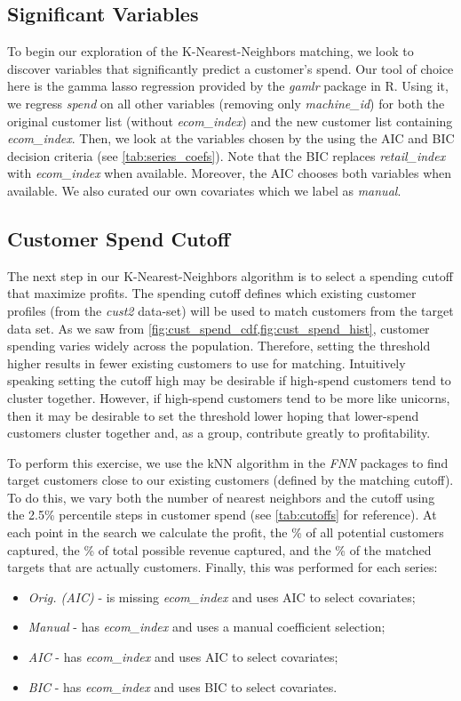 \subsection{Significant Variables}
To begin our exploration of the K-Nearest-Neighbors matching, we look to discover variables that significantly predict a customer's spend.  Our tool of choice here is the gamma lasso regression provided by the \textit{gamlr} package in R.  Using it, we regress \textit{spend} on all other variables (removing only \textit{machine\_id}) for both the original customer list (without \textit{ecom\_index}) and the new customer list containing \textit{ecom\_index}.  Then, we look at the variables chosen by the using the AIC and BIC decision criteria (see \vref{tab:series_coefs}).  Note that the BIC replaces \textit{retail\_index} with \textit{ecom\_index} when available.  Moreover, the AIC chooses both variables when available.  We also curated our own covariates which we label as \textit{manual}.



\subsection{Customer Spend Cutoff}
The next step in our K-Nearest-Neighbors algorithm is to select a spending cutoff that maximize profits.  The spending cutoff defines which existing customer profiles (from the \textit{cust2} data-set) will be used to match customers from the target data set.  As we saw from \vref{fig:cust_spend_cdf,fig:cust_spend_hist}, customer spending varies widely across the population.  Therefore, setting the threshold higher results in fewer existing customers to use for matching.  Intuitively speaking setting the cutoff high may be desirable if high-spend customers tend to cluster together.  However, if high-spend customers tend to be more like unicorns, then it may be desirable to set the threshold lower hoping that lower-spend customers cluster together and, as a group, contribute greatly to profitability.

To perform this exercise, we use the kNN algorithm in the \textit{FNN} packages to find target customers close to our existing customers (defined by the matching cutoff).  To do this, we vary both the number of nearest neighbors and the cutoff using the 2.5\% percentile steps in customer spend (see \vref{tab:cutoffs} for reference).  At each point in the search we calculate the profit, the \% of all potential customers captured, the \% of total possible revenue captured, and the \% of the matched targets that are actually customers.  Finally, this was performed for each series:
\begin{itemize}
\item \textit{Orig. (AIC)} - is missing \textit{ecom\_index} and uses AIC to select covariates;
\item \textit{Manual} - has \textit{ecom\_index} and uses a manual coefficient selection;
\item \textit{AIC} - has \textit{ecom\_index} and uses AIC to select covariates;
\item \textit{BIC} - has \textit{ecom\_index} and uses BIC to select covariates.
\end{itemize}

